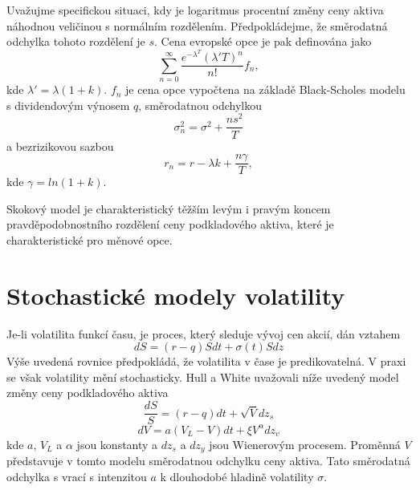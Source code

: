 \documentclass[a4paper]{book}
\begin{document}
Uvažujme specifickou situaci, kdy je logaritmus procentní změny ceny aktiva náhodnou veličinou s normálním rozdělením. Předpokládejme, že směrodatná odchylka tohoto rozdělení je $s$. Cena evropské opce je pak definována jako
\begin{equation*}
\sum^\infty_{n=0}\frac{e^{-\lambda^T}(\lambda' T)^n}{n!}f_n,
\end{equation*}
kde $\lambda' = \lambda(1+k)$. $f_n$ je cena opce vypočtena na základě Black-Scholes modelu s dividendovým výnosem $q$, směrodatnou odchylkou
\begin{equation*}
\sigma^2_n = \sigma^2 + \frac{n s^2}{T}
\end{equation*}
a bezrizikovou sazbou
\begin{equation*}
r_n = r - \lambda k + \frac{n \gamma}{T},
\end{equation*}
kde $\gamma = ln(1+k)$.

Skokový model je charakteristický těžším levým i pravým koncem pravděpodobnostního rozdělení ceny podkladového aktiva, které je charakteristické pro měnové opce.

\section{Stochastické modely volatility}

Je-li volatilita funkcí času, je proces, který sleduje vývoj cen akcií, dán vztahem
\begin{equation*}
dS = (r - q)S dt + \sigma(t)S dz
\end{equation*}
Výše uvedená rovnice předpokládá, že volatilita v čase je predikovatelná. V praxi se však volatility mění stochasticky. Hull a White uvažovali níže uvedený model změny ceny podkladového aktiva
\begin{equation*}
\frac{d S}{S} = (r - q)dt + \sqrt{V}dz_s
\end{equation*}
\begin{equation*}
d V = a(V_L - V)dt + \xi V^\alpha dz_v
\end{equation*}
kde $a$, $V_L$ a $\alpha$ jsou konstanty a $dz_s$ a $dz_y$ jsou Wienerovým procesem. Proměnná $V$ představuje v tomto modelu směrodatnou odchylku ceny aktiva. Tato směrodatná odchylka s vrací s intenzitou $a$ k dlouhodobé hladině volatility $\sigma$.
\end{document}
